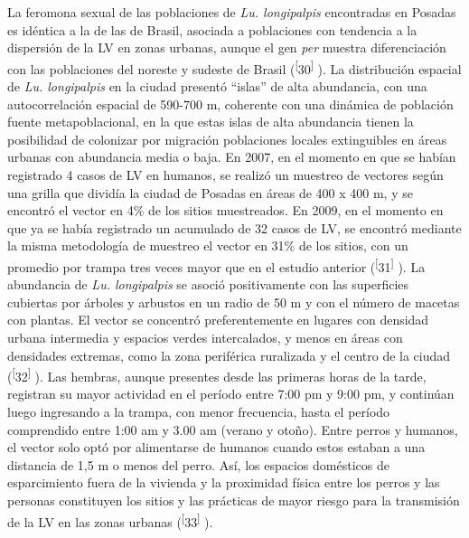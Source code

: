 \documentclass{article}
\begin{document}
La feromona sexual de las poblaciones de \textit{Lu. longipalpis}
encontradas en Posadas es idéntica a la de las de Brasil, asociada a poblaciones
con tendencia a la dispersión de la LV en zonas urbanas, aunque el gen
\textit{per}
muestra diferenciación con las poblaciones del noreste y sudeste de Brasil
(\textsuperscript{[}30\textsuperscript{]}
). La distribución espacial de \textit{Lu. longipalpis}
en la ciudad presentó “islas” de alta abundancia, con una autocorrelación
espacial de 590-700 m, coherente con una dinámica de población fuente
metapoblacional, en la que estas islas de alta abundancia tienen la posibilidad
de colonizar por migración poblaciones locales extinguibles en áreas urbanas con
abundancia media o baja. En 2007, en el momento en que se habían registrado 4
casos de LV en humanos, se realizó un muestreo de vectores según una grilla que
dividía la ciudad de Posadas en áreas de 400 x 400 m, y se encontró el vector en
4\% de los sitios muestreados. En 2009, en el momento en que ya se había
registrado un acumulado de 32 casos de LV, se encontró mediante la misma
metodología de muestreo el vector en 31\% de los sitios, con un promedio por
trampa tres veces mayor que en el estudio anterior
(\textsuperscript{[}31\textsuperscript{]}
). La abundancia de \textit{Lu. longipalpis}
se asoció positivamente con las superficies cubiertas por árboles y arbustos en
un radio de 50 m y con el número de macetas con plantas. El vector se concentró
preferentemente en lugares con densidad urbana intermedia y espacios verdes
intercalados, y menos en áreas con densidades extremas, como la zona periférica
ruralizada y el centro de la ciudad (\textsuperscript{[}32\textsuperscript{]}
). Las hembras, aunque presentes desde las primeras horas de la tarde, registran
su mayor actividad en el período entre 7:00 pm y 9:00 pm, y continúan luego
ingresando a la trampa, con menor frecuencia, hasta el período comprendido entre
1:00 am y 3.00 am (verano y otoño). Entre perros y humanos, el vector solo optó
por alimentarse de humanos cuando estos estaban a una distancia de 1,5 m o menos
del perro. Así, los espacios domésticos de esparcimiento fuera de la vivienda y
la proximidad física entre los perros y las personas constituyen los sitios y
las prácticas de mayor riesgo para la transmisión de la LV en las zonas urbanas
(\textsuperscript{[}33\textsuperscript{]}
).
\end{document}
